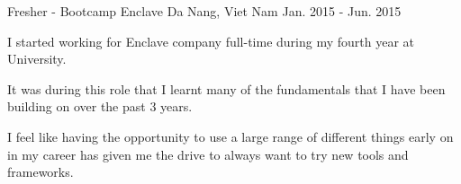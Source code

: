 \begin{cventries}
  \cventry
    {Fresher - Bootcamp} %
    {Enclave} %
    {Da Nang, Viet Nam} %
    {Jan. 2015 - Jun. 2015} %
    {
      \begin{cvitems} %
        \item {I started working for Enclave company full-time during my fourth year at University.}
        \item {It was during this role that I learnt many of the fundamentals that I have been building on over the past 3 years.}
        \item {I feel like having the opportunity to use a large range of different things early on in my career has given me the drive to always want to try new tools and frameworks.}
      \end{cvitems}
    }

\end{cventries}
